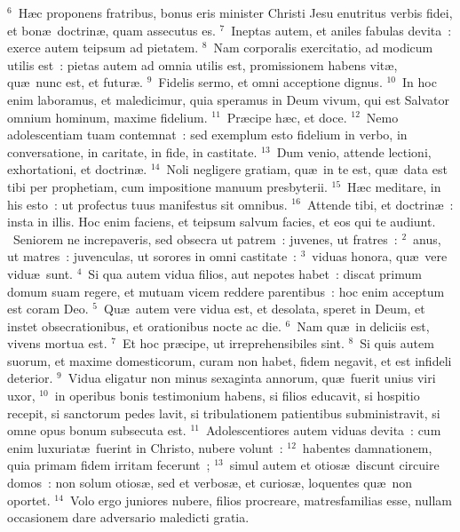 ${}^{6}$~H\ae c proponens fratribus, bonus eris minister Christi Jesu enutritus verbis fidei, et bon\ae\ doctrin\ae , quam assecutus es.
${}^{7}$~Ineptas autem, et aniles fabulas devita~: exerce autem teipsum ad pietatem.
${}^{8}$~Nam corporalis exercitatio, ad modicum utilis est~: pietas autem ad omnia utilis est, promissionem habens vit\ae , qu\ae\ nunc est, et futur\ae .
${}^{9}$~Fidelis sermo, et omni acceptione dignus.
${}^{10}$~In hoc enim laboramus, et maledicimur, quia speramus in Deum vivum, qui est Salvator omnium hominum, maxime fidelium.
${}^{11}$~Pr\ae cipe h\ae c, et doce.
${}^{12}$~Nemo adolescentiam tuam contemnat~: sed exemplum esto fidelium in verbo, in conversatione, in caritate, in fide, in castitate.
${}^{13}$~Dum venio, attende lectioni, exhortationi, et doctrin\ae .
${}^{14}$~Noli negligere gratiam, qu\ae\ in te est, qu\ae\ data est tibi per prophetiam, cum impositione manuum presbyterii.
${}^{15}$~H\ae c meditare, in his esto~: ut profectus tuus manifestus sit omnibus.
${}^{16}$~Attende tibi, et doctrin\ae~: insta in illis. Hoc enim faciens, et teipsum salvum facies, et eos qui te audiunt.
~\lettrine[lines=10,image=true,loversize=0.05,lraise=-0.03]{S}{}eniorem ne increpaveris, sed obsecra ut patrem~: juvenes, ut fratres~:
${}^{2}$~anus, ut matres~: juvenculas, ut sorores in omni castitate~:
${}^{3}$~viduas honora, qu\ae\ vere vidu\ae\ sunt.
${}^{4}$~Si qua autem vidua filios, aut nepotes habet~: discat primum domum suam regere, et mutuam vicem reddere parentibus~: hoc enim acceptum est coram Deo.
${}^{5}$~Qu\ae\ autem vere vidua est, et desolata, speret in Deum, et instet obsecrationibus, et orationibus nocte ac die.
${}^{6}$~Nam qu\ae\ in deliciis est, vivens mortua est.
${}^{7}$~Et hoc pr\ae cipe, ut irreprehensibiles sint.
${}^{8}$~Si quis autem suorum, et maxime domesticorum, curam non habet, fidem negavit, et est infideli deterior.
${}^{9}$~Vidua eligatur non minus sexaginta annorum, qu\ae\ fuerit unius viri uxor,
${}^{10}$~in operibus bonis testimonium habens, si filios educavit, si hospitio recepit, si sanctorum pedes lavit, si tribulationem patientibus subministravit, si omne opus bonum subsecuta est.
${}^{11}$~Adolescentiores autem viduas devita~: cum enim luxuriat\ae\ fuerint in Christo, nubere volunt~:
${}^{12}$~habentes damnationem, quia primam fidem irritam fecerunt~;
${}^{13}$~simul autem et otios\ae\ discunt circuire domos~: non solum otios\ae , sed et verbos\ae , et curios\ae , loquentes qu\ae\ non oportet.
${}^{14}$~Volo ergo juniores nubere, filios procreare, matresfamilias esse, nullam occasionem dare adversario maledicti gratia.

